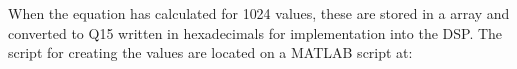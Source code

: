\vspace{2mm}
When the equation has calculated for 1024 values, these are stored in a array and converted to Q15 written in hexadecimals for implementation into the DSP.
The script for creating the values are located on a MATLAB script at: \\







